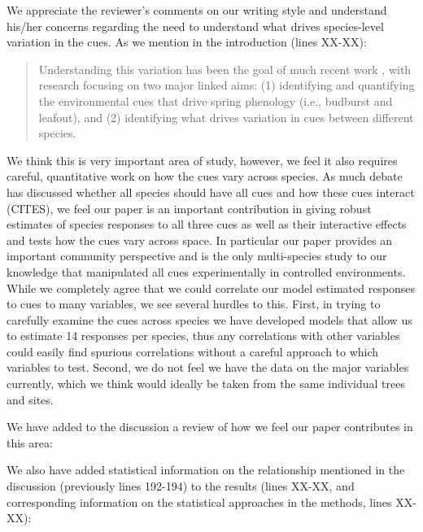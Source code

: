 \documentclass[11pt,a4paper]{article}
\begin{document}
We appreciate the reviewer's comments on our writing style and understand his/her concerns regarding the need to understand what drives species-level variation in the cues. As we mention in the introduction (lines XX-XX):

\begin{quote}
Understanding this variation has been the goal of much recent work \citep{Rutishauser:2008fu,Laube2015,donnelly2017,zohner2017}, with research focusing on two major linked aims: (1) identifying and quantifying the environmental cues that drive spring phenology (i.e., budburst and leafout), and (2) identifying what drives variation in cues between different species.
\end{quote}
We think this is very important area of study, however, we feel it also requires careful, quantitative work on how the cues vary across species. As much debate has discussed whether all species should have all cues and how these cues interact (CITES), we feel our paper is an important contribution in giving robust estimates of species responses to all three cues as well as their interactive effects and tests how the cues vary across space. In particular our paper provides an important community perspective and is the only multi-species study to our knowledge that manipulated all cues experimentally in controlled environments. While we completely agree that we could correlate our model estimated responses to cues to many variables, we see several hurdles to this. First, in trying to carefully examine the cues across species we have developed models that allow us to estimate 14 responses per species, thus any correlations with other variables could easily find spurious correlations without a careful approach to which variables to test. Second, we do not feel we have the data on the major variables currently, which we think would ideally be taken from the same individual trees and sites. 

We have added to the discussion a review of how we feel our paper contributes in this area:
\begin{quote}
\end{quote}

We also have added statistical information on the relationship mentioned in the discussion (previously lines 192-194) to the results (lines XX-XX, and corresponding information on the statistical approaches in the methods, lines XX-XX):
\begin{quote}
\end{quote}
\end{document}
